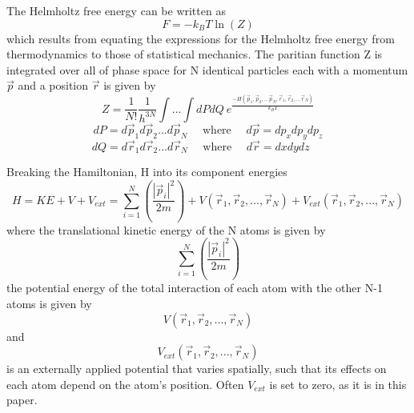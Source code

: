 \documentclass[12pt]{article}
\begin{document}
The Helmholtz free energy can be written as
\begin{equation}{F=-k_{B}T\ln(Z)}\end{equation}
which results from equating the expressions for the Helmholtz free energy from thermodynamics to those of statistical mechanics. The paritian function Z is integrated over all of phase space for N identical particles each with a momentum $\vec{p}$ and a position $\vec{r}$ is given by
\begin{equation}{Z=}\frac{1}{N!}\frac{1}{h^{3N}}\int{...}\int{dPdQ}~e^\frac{-H(\vec{p}_1,\vec{p}_2,...\vec{p}_N,\vec{r}_1, \vec{r}_2,...\vec{r}_N)}{k_BT}\end{equation}
\begin{displaymath}{dP=d\vec{p}_1d\vec{p}_2...d\vec{p}_N \mbox{~~~~where~~~~} d\vec{p}=dp_xdp_ydp_z}\end{displaymath}
\begin{displaymath}{dQ=d\vec{r}_1d\vec{r}_2...d\vec{r}_N \mbox{~~~~where~~~~} d\vec{r}=dxdydz\mbox{~~~~}}\end{displaymath}

Breaking the Hamiltonian, H into its component energies
\begin{equation}{H = KE + V + V_{ext} = \sum_{i=1}^N\left(\frac{|\vec{p}_i|^2}{2m}\right)+V(\vec{r}_1,\vec{r}_2,{...},\vec{r}_N)+V_{ext}(\vec{r}_1,\vec{r}_2,{...},\vec{r}_N)}\end{equation}
where the translational kinetic energy of the N atoms is given by \begin{displaymath}{\sum_{i=1}^N\left(\frac{|\vec{p}_i|^2}{2m}\right)}\end{displaymath}
the potential energy of the total interaction of each atom with the other N-1 atoms is given by
\begin{displaymath}{V(\vec{r}_1,\vec{r}_2,{...},\vec{r}_N)}\end{displaymath} and \begin{displaymath}{V_{ext}(\vec{r}_1,\vec{r}_2,{...},\vec{r}_N)}\end{displaymath} is an externally applied potential that varies spatially, such that its effects on each atom depend on the atom's position. Often $V_{ext}$ is set to zero, as it is in this paper. 
\end{document}
